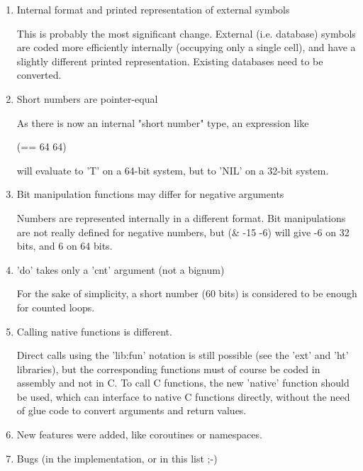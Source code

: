 \begin{enumerate}
\item  Internal format and printed representation of external symbols

   This is probably the most significant change. External (i.e. database)
   symbols are coded more efficiently internally (occupying only a single cell),
   and have a slightly different printed representation. Existing databases need
   to be converted.

\item  Short numbers are pointer-equal

   As there is now an internal "short number" type, an expression like

\begin{wideverbatim}
      (== 64 64)
\end{wideverbatim}

   will evaluate to 'T' on a 64-bit system, but to 'NIL' on a 32-bit system.

\item  Bit manipulation functions may differ for negative arguments

  Numbers are represented internally in a different format. Bit
  manipulations are not really defined for negative numbers, but (&
  -15 -6) will give -6 on 32 bits, and 6 on 64 bits.

\item  'do' takes only a 'cnt' argument (not a bignum)

  For the sake of simplicity, a short number (60 bits) is considered
  to be enough for counted loops.

 \item  Calling native functions is different.

   Direct calls using the 'lib:fun' notation is still possible (see
   the 'ext' and 'ht' libraries), but the corresponding functions must
   of course be coded in assembly and not in C. To call C functions,
   the new 'native' function should be used, which can interface to
   native C functions directly, without the need of glue code to
   convert arguments and return values.

\item  New features were added, like coroutines or namespaces.

\item  Bugs (in the implementation, or in this list ;-)

\end{enumerate}

